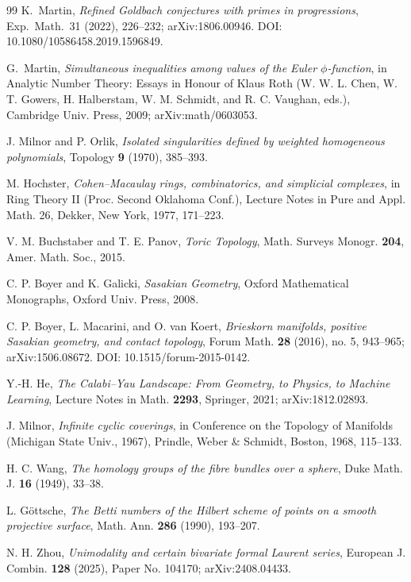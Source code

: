 \documentclass[11pt]{article}
\theoremstyle{definition}
\begin{document}
\begin{thebibliography}{99}
 K.~Martin,
\emph{Refined Goldbach conjectures with primes in progressions},
Exp.\ Math.\ 31 (2022), 226--232; arXiv:1806.00946.
DOI: 10.1080/10586458.2019.1596849.

 G.~Martin,
\emph{Simultaneous inequalities among values of the Euler $\phi$-function},
in Analytic Number Theory: Essays in Honour of Klaus Roth (W. W. L. Chen, W. T. Gowers, H. Halberstam, W. M. Schmidt, and R. C. Vaughan, eds.), Cambridge Univ. Press, 2009; arXiv:math/0603053.

 J. Milnor and P. Orlik, \emph{Isolated singularities defined by weighted homogeneous polynomials}, Topology \textbf{9} (1970), 385--393.

 M. Hochster, \emph{Cohen--Macaulay rings, combinatorics, and simplicial complexes}, in Ring Theory II (Proc. Second Oklahoma Conf.), Lecture Notes in Pure and Appl. Math. 26, Dekker, New York, 1977, 171--223.

 V. M. Buchstaber and T. E. Panov, \emph{Toric Topology}, Math. Surveys Monogr. \textbf{204}, Amer. Math. Soc., 2015.

 C. P. Boyer and K. Galicki, \emph{Sasakian Geometry}, Oxford Mathematical Monographs, Oxford Univ. Press, 2008.

 C. P. Boyer, L. Macarini, and O. van Koert, \emph{Brieskorn manifolds, positive Sasakian geometry, and contact topology}, Forum Math. \textbf{28} (2016), no. 5, 943--965; arXiv:1506.08672. DOI: 10.1515/forum-2015-0142.

 Y.-H. He, \emph{The Calabi--Yau Landscape: From Geometry, to Physics, to Machine Learning}, Lecture Notes in Math. \textbf{2293}, Springer, 2021; arXiv:1812.02893.

 J. Milnor, \emph{Infinite cyclic coverings}, in Conference on the Topology of Manifolds (Michigan State Univ., 1967), Prindle, Weber \& Schmidt, Boston, 1968, 115--133.

 H. C. Wang, \emph{The homology groups of the fibre bundles over a sphere}, Duke Math. J. \textbf{16} (1949), 33--38.

 L. G\"ottsche, \emph{The Betti numbers of the Hilbert scheme of points on a smooth projective surface}, Math. Ann. \textbf{286} (1990), 193--207.

 N. H. Zhou, \emph{Unimodality and certain bivariate formal Laurent series}, European J. Combin. \textbf{128} (2025), Paper No. 104170; arXiv:2408.04433.


\end{thebibliography}
\end{document}
